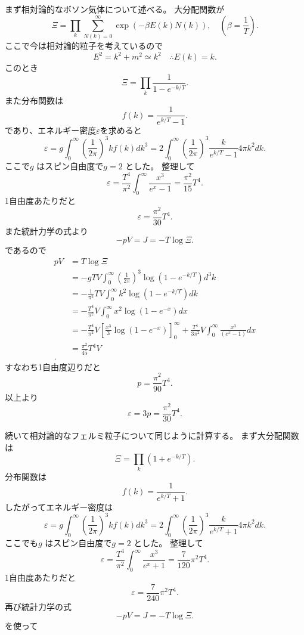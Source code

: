 \documentclass[dvipdfmx]{jsarticle}
\begin{document}
\subsection{}\label{3-1}
まず相対論的なボソン気体について述べる。
大分配関数が
\[
\Xi=\prod_k \sum_{N(k)=0}^{\infty} \exp (-\beta E(k)N(k)) ,\quad(\beta=\frac{1}{T})
.\] 
ここで今は相対論的粒子を考えているので
\[
E^2=k^2+m^2\simeq k^2 \quad \therefore E(k)=k
.\] 
このとき
\[
\Xi=\prod _k \frac{1}{1-e^{-k /T}}
.\] 
また分布関数は
\[
f(k)=\frac{1}{e^{k /T}-1}
.\] 
であり、エネルギー密度$\varepsilon$を求めると
\[
\varepsilon=g \int_{0}^{\infty} \left( \frac{1}{2\pi} \right) ^3 kf(k)dk^3=  2 \int_{0}^{\infty} \left( \frac{1}{2\pi} \right) ^3 \frac{k}{e^{k /T}-1}4\pi k^2dk
.\] 
ここで$g$ はスピン自由度で$g=2$ とした。
整理して
\[
\varepsilon=\frac{T^{4}}{\pi^2}\int_{0}^{\infty} \frac{x^3}{e^{x}-1} =\frac{\pi^2}{15}T^{4}
.\] 
1自由度あたりだと
\[
\varepsilon=\frac{\pi^2}{30}T^{4}
.\] 
また統計力学の式より
\[
	-pV=J=-T\log \Xi
.\] 
であるので
\begin{align*}
	pV&= T\log \Xi \\
	&= -gTV \int_{0}^{\infty}\left( \frac{1}{2\pi} \right) ^3\log (1-e^{-k /T})d^3k   \\
	&=- \frac{1}{\pi^2}TV \int_{0}^{\infty} k^2\log (1-e^{-k /T})dk  \\
	&= -\frac{T^{4}}{\pi^2}V \int_{0}^{\infty} x^2\log (1-e^{-x})dx  \\
	&= -\frac{T^{4}}{\pi^2}V\left[ \frac{x^3}{3}\log (1-e^{-x}) \right] _{0}^{\infty}+\frac{T^{4}}{3\pi^2}V \int_{0}^{\infty} \frac{x^3}{(e^{x}-1)}dx  \\
	&=\frac{\pi^2}{45}T^{4}V  \\
.\end{align*}
すなわち1自由度辺りだと
\begin{equation}
\label{eq:p3}
p=\frac{\pi^2}{90}T^{4}
.\end{equation}
以上より
\begin{equation}
\label{eq:31}
	\varepsilon=3p=\frac{\pi^2}{30}T^{4}
.\end{equation}

続いて相対論的なフェルミ粒子について同じように計算する。
まず大分配関数は
\[
\Xi=\prod _k (1+e^{-k /T})
.\] 
分布関数は
\[
f(k)=\frac{1}{e^{k /T}+1}
.\] 
したがってエネルギー密度は
\[
\varepsilon=g \int_{0}^{\infty} \left( \frac{1}{2\pi} \right) ^3 kf(k)dk^3=  2 \int_{0}^{\infty} \left( \frac{1}{2\pi} \right) ^3 \frac{k}{e^{k /T}+1}4\pi k^2dk
.\] 
ここでも$g$ はスピン自由度で$g=2$ とした。
整理して
\[
\varepsilon=\frac{T^{4}}{\pi^2}\int_{0}^{\infty} \frac{x^3}{e^{x}+1} =\frac{7}{120}\pi^2T^{4}
.\] 
1自由度あたりだと
\[
\varepsilon=\frac{7}{240}\pi^2T^{4}
.\] 
再び統計力学の式
\[
	-pV=J=-T\log \Xi
.\] 
を使って
\end{document}

